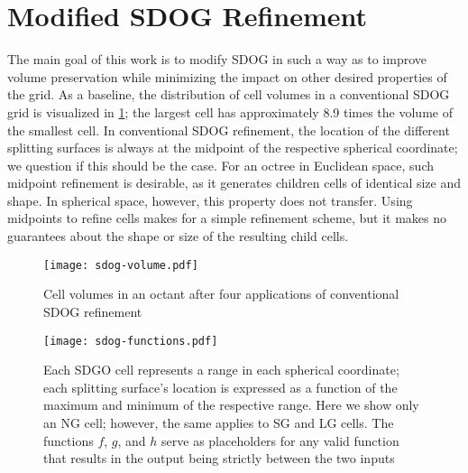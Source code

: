 \section{Modified SDOG Refinement} \label{chap:4:modified}
The main goal of this work is to modify SDOG in such a way as to improve volume preservation while minimizing the impact on other desired properties of the grid.
As a baseline, the distribution of cell volumes in a conventional SDOG grid is visualized in \cref{fig:sdog-volume}; the largest cell has approximately 8.9 times the volume of the smallest cell.
In conventional SDOG refinement, the location of the different splitting surfaces is always at the midpoint of the respective spherical coordinate; we question if this should be the case.
For an octree in Euclidean space, such midpoint refinement is desirable, as it generates children cells of identical size and shape.
In spherical space, however, this property does not transfer.
Using midpoints to refine cells makes for a simple refinement scheme, but it makes no guarantees about the shape or size of the resulting child cells.


\begin{figure}[ht!]
	\centering
	\texttt{[image: sdog-volume.pdf]}
	\caption[Visualization of cell volumes in SDOG]{
		Cell volumes in an octant after four applications of conventional SDOG refinement
	}
	\label{fig:sdog-volume}
\end{figure}


\begin{figure}[ht!]
	\centering
	\texttt{[image: sdog-functions.pdf]}
	\caption[How functions determine the location of SDOG splitting surfaces]{
		Each SDGO cell represents a range in each spherical coordinate; each splitting surface's location is expressed as a function of the maximum and minimum of the respective range.
		Here we show only an NG cell; however, the same applies to SG and LG cells.
		The functions $f$, $g$, and $h$ serve as placeholders for any valid function that results in the output being strictly between the two inputs
	}
	\label{fig:functions}
\end{figure}


